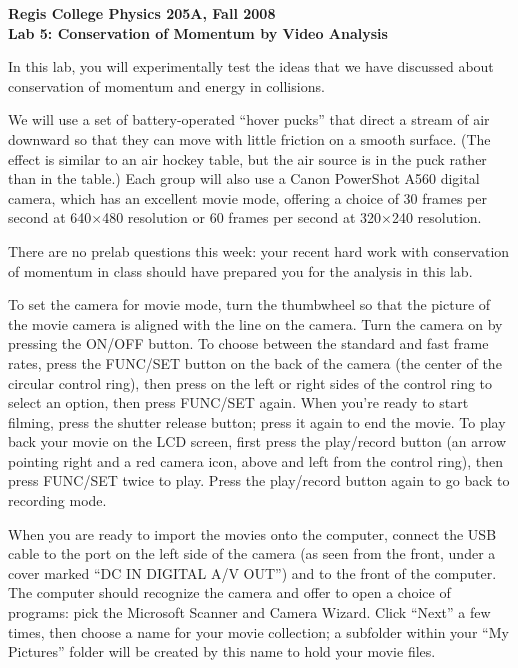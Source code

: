 \documentclass[12pt]{article}
\begin{document}
\begin{center}
{\bf{Regis College Physics 205A, Fall 2008}} \\
{\bf{Lab 5: Conservation of Momentum by Video Analysis}} \\
\end{center}

In this lab, you will experimentally test the ideas that we have discussed
about conservation of momentum and energy in collisions.

We will use a set of battery-operated ``hover pucks'' that direct a stream 
of air downward
so that they can move with little friction on a smooth surface.  (The effect
is similar to an air hockey table, but the air source is in the puck
rather than in the table.)  Each group will also use a Canon PowerShot A560 
digital camera, which has an excellent movie mode, offering a choice of 
30 frames per second at 640$\times$480 resolution or 60 frames per second at 
320$\times$240 resolution.

There are no prelab questions this week: your recent hard work with 
conservation of momentum in class should have prepared you for the
analysis in this lab.  

\bigskip
{}

To set the camera for movie mode, turn the thumbwheel so that the picture of
the movie camera is aligned with the line on the camera.  Turn the camera on
by pressing the ON/OFF button.  To choose between the standard and fast frame
rates, press the FUNC/SET button on the back of the camera (the center of 
the circular control ring), then press on the left or right sides of the 
control ring to select an option, then press FUNC/SET again.  When you're ready 
to start filming, press the shutter release button; press it again to end the 
movie.  To play back your movie on the LCD screen, first press the play/record 
button (an arrow pointing right and a red camera icon, above and left from the 
control ring), then press FUNC/SET twice to play.  Press the play/record button
again to go back to recording mode.

When you are ready to import the movies onto the computer, connect the USB 
cable to the port on the left side of the camera (as seen from the front, 
under a cover marked ``DC IN DIGITAL A/V OUT'') and to the front of the 
computer.  The computer should recognize the camera and offer to open a 
choice of programs: pick the Microsoft Scanner and Camera Wizard. 
Click ``Next'' a few times, then choose a name for your movie collection; a
subfolder within your ``My Pictures'' folder will be created by this name
to hold your movie files.
\end{document}
